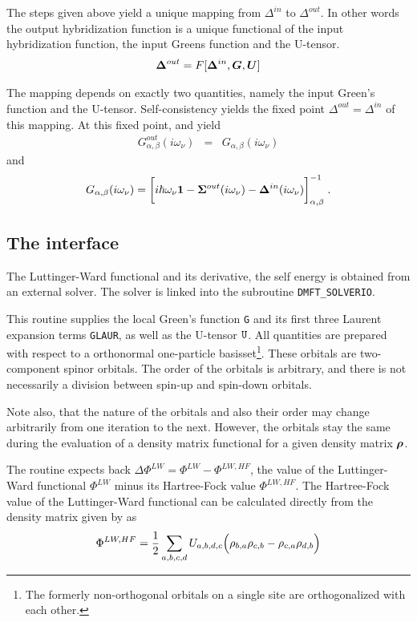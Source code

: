 \documentclass[11pt,a4paper]{report}
\begin{document}
The steps given above yield a unique mapping from $\Delta^{in}$ to
$\Delta^{out}$. In other words the output hybridization function is a
unique functional of the input hybridization function, the input
Greens function and the U-tensor.
\begin{eqnarray}
\bm{\Delta}^{out}=F[\bm{\Delta}^{in},\bm{G},\bm{U}]
\end{eqnarray}


The mapping depends on exactly two quantities, namely
the input Green's function and the U-tensor. Self-consistency yields the 
fixed point $\Delta^{out}=\Delta^{in}$ of this mapping.
At this fixed point,  and  yield
\begin{eqnarray}
G^{out}_{\alpha,\beta}(i\omega_\nu)&=&G_{\alpha,\beta}(i\omega_\nu)
\end{eqnarray}
and 
\begin{eqnarray}
G_{\alpha,\beta}(i\omega_\nu)
=\biggl[
i\hbar\omega_\nu\bm{1}
-\bm{\Sigma}^{out}(i\omega_\nu)
-\bm{\Delta}^{in}(i\omega_\nu)
\biggr]^{-1}_{\alpha,\beta}
\;.
\end{eqnarray}


\subsection{The interface}
The Luttinger-Ward functional and its derivative, the self energy is
obtained from an external solver. The solver is linked into the
subroutine \verb|DMFT_SOLVERIO|.

This routine supplies the local Green's function \verb|G| and its
first three Laurent expansion terms \verb|GLAUR|, as well as the
U-tensor $\verb|U|$. All quantities are prepared with respect to a
orthonormal one-particle basisset\footnote{The formerly non-orthogonal
  orbitals on a single site are orthogonalized with each
  other.}. These orbitals are two-component spinor orbitals. The order
of the orbitals is arbitrary, and there is not necessarily a division
between spin-up and spin-down orbitals.

Note also, that the nature of the orbitals and also their order may
change arbitrarily from one iteration to the next. However, the
orbitals stay the same during the evaluation of a density
matrix functional for a given density matrix $\bm{\rho}$.


The routine expects back $\Delta\Phi^{LW}=\Phi^{LW}-\Phi^{LW,HF}$, the
value of the Luttinger-Ward functional $\Phi^{LW}$ minus its Hartree-Fock value
$\Phi^{LW,HF}$. The Hartree-Fock value of the Luttinger-Ward
functional can be calculated directly from the density matrix given by
 as
\begin{eqnarray}
\Phi^{LW,HF}=\frac{1}{2}\sum_{a,b,c,d}U_{a,b,d,c}
\Bigl(\rho_{b,a}\rho_{c,b}-\rho_{c,a}\rho_{d,b}\Bigr)
\label{eq:philwhf}
\end{eqnarray}
\end{document}
